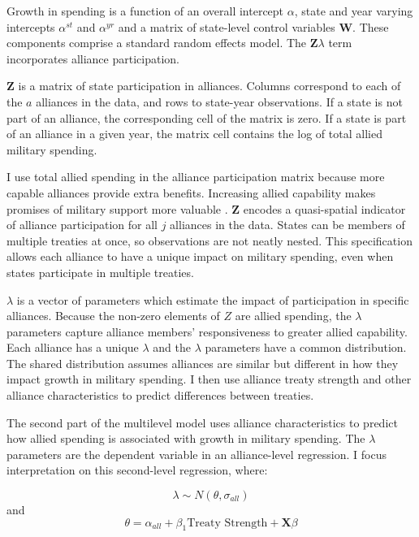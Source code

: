 \documentclass[12pt]{article}
\begin{document}
Growth in spending is a function of an overall intercept $\alpha$, state and year varying intercepts $\alpha^{st}$ and $\alpha^{yr}$ and a matrix of state-level control variables $\textbf{W}$.
These components comprise a standard random effects model. 
The $\textbf{Z} \lambda$ term incorporates alliance participation.


$\textbf{Z}$ is a matrix of state participation in alliances. 
Columns correspond to each of the $a$ alliances in the data, and rows to state-year observations. 
If a state is not part of an alliance, the corresponding cell of the matrix is zero.
If a state is part of an alliance in a given year, the matrix cell contains the log of total allied military spending.


I use total allied spending in the alliance participation matrix because more capable alliances provide extra benefits.
Increasing allied capability makes promises of military support more valuable \citep{Johnsonetal2015}.  
$\textbf{Z}$ encodes a quasi-spatial indicator of alliance participation for all $j$ alliances in the data. 
States can be members of multiple treaties at once, so observations are not neatly nested. 
This specification allows each alliance to have a unique impact on military spending, even when states participate in multiple treaties. 


$\lambda$ is a vector of parameters which estimate the impact of participation in specific alliances. 
Because the non-zero elements of $Z$ are allied spending, the $\lambda$ parameters capture alliance members' responsiveness to greater allied capability. 
Each alliance has a unique $\lambda$ and the $\lambda$ parameters have a common distribution. 
The shared distribution assumes alliances are similar but different in how they impact growth in military spending. 
I then use alliance treaty strength and other alliance characteristics to predict differences between treaties. 


The second part of the multilevel model uses alliance characteristics to predict how allied spending is associated with growth in military spending. 
The $\lambda$ parameters are the dependent variable in an alliance-level regression.
I focus interpretation on this second-level regression, where: 

\begin{equation}
\lambda \sim N(\theta, \sigma_{all})
\end{equation} 
and 
\begin{equation}
\theta = \alpha_{all} + \beta_1 \mbox{Treaty Strength} + \textbf{X} \beta
\end{equation}
\end{document}
